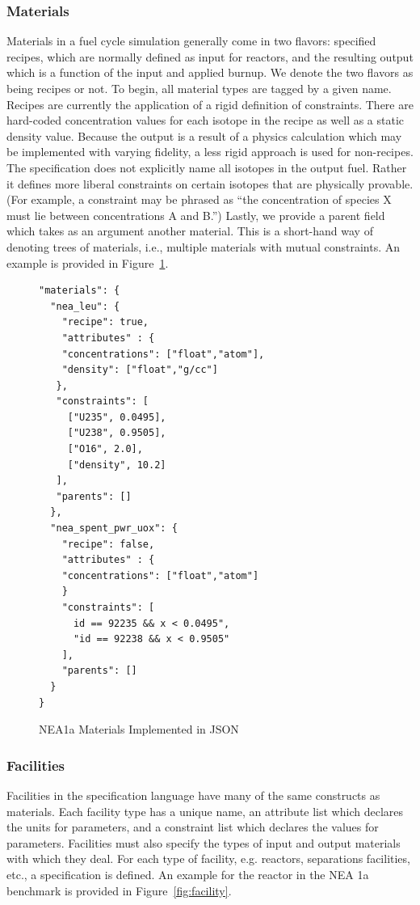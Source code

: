 \subsubsection{Materials}
Materials in a fuel cycle simulation generally come in two flavors: specified
recipes, which are normally defined as input for reactors, and the resulting
output which is a function of the input and applied burnup. We denote the two
flavors as being recipes or not. To begin, all material types are tagged by a
given name. Recipes are currently the application of a rigid definition of
constraints. There are hard-coded concentration values for each isotope in the
recipe as well as a static density value. Because the output is a result of a
physics calculation which may be implemented with varying fidelity, a less rigid
approach is used for non-recipes. The specification does not explicitly name all
isotopes in the output fuel. Rather it defines more liberal constraints on
certain isotopes that are physically provable.  (For example, a constraint may be
phrased as ``the concentration of species X must lie between concentrations A
and B.'') Lastly, we provide a parent field which takes as an argument another
material. This is a short-hand way of denoting trees of materials, i.e.,
multiple materials with mutual constraints. An example is provided in
Figure~\ref{fig:material}.

\begin{figure}[h!]
\begin{Verbatim}[frame=single]
"materials": {
  "nea_leu": {
    "recipe": true,
    "attributes" : {
    "concentrations": ["float","atom"],
    "density": ["float","g/cc"]
   },
   "constraints": [        
     ["U235", 0.0495],
     ["U238", 0.9505],
     ["O16", 2.0],
     ["density", 10.2]
   ], 
   "parents": []
  },
  "nea_spent_pwr_uox": {
    "recipe": false,
    "attributes" : {
    "concentrations": ["float","atom"]
    }
    "constraints": [
      id == 92235 && x < 0.0495",
      "id == 92238 && x < 0.9505"
    ], 
    "parents": []
  }
}
\end{Verbatim}
\caption{NEA1a Materials Implemented in JSON}
\label{fig:material}
\end{figure}

\subsubsection{Facilities}
Facilities in the specification language have many of the same constructs as
materials. Each facility type has a unique name, an attribute list which
declares the units for parameters, and a constraint list which declares the
values for parameters. Facilities must also specify the types of input and
output materials with which they deal. For each type of facility, e.g. reactors,
separations facilities, etc., a specification is defined. An example for the
reactor in the NEA 1a benchmark is provided in Figure~\ref{fig:facility}.

